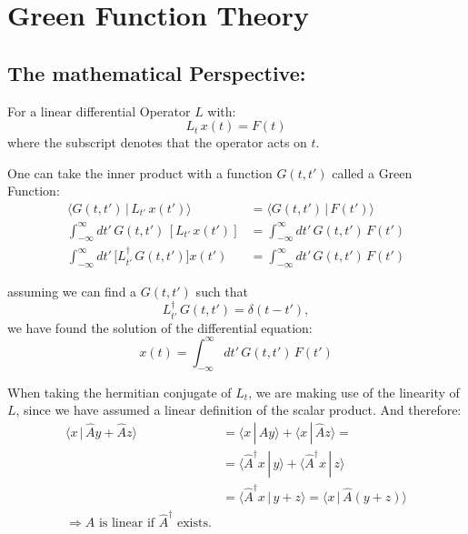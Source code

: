 \chapter{Green Function Theory}\label{chapter:theory}

\section{The mathematical Perspective:}

For a linear differential Operator $L$ with:
\begin{equation*}
    L_t\, x(t) = F(t)
\end{equation*}
where the subscript denotes that the operator acts on $t$.

\bigskip

One can take the inner product with a function $G(t,t')$ called a Green Function:
\begin{align*}
    \langle G(t,t') \,|\, L_{t'}\, x(t') \rangle &= \langle G(t,t') \,|\, F(t') \rangle \\
    \int_{-\infty}^{\infty} dt'\, G(t,t')\, [L_{t'}\, x(t')] &= \int_{-\infty}^{\infty} dt'\, G(t,t')\, F(t') \\
    \int_{-\infty}^{\infty} dt'\, \big[ L_{t'}^{\dagger}\, G(t,t') \big] x(t') &= \int_{-\infty}^{\infty} dt'\, G(t,t')\, F(t')
\end{align*}

assuming we can find a $G(t,t')$ such that
\begin{equation*}
    L_{t'}^{\dagger}\, G(t,t') = \delta(t-t'),
\end{equation*}
we have found the solution of the differential equation:
\begin{equation*}
    x(t) = \int_{-\infty}^{\infty} dt'\, G(t,t')\, F(t')
\end{equation*}

\bigskip

When taking the hermitian conjugate of $L_t$, we are making use of the linearity of $L$, since we have assumed a linear definition of the scalar product. And therefore:
\begin{align*}
    \langle x \,|\, \hat{A}y + \hat{A}z \rangle &= \langle x \,|\, \hat{A}y \rangle + \langle x \,|\, \hat{A}z \rangle = \\
    &= \langle \hat{A}^{\dagger} x \,|\, y \rangle + \langle \hat{A}^{\dagger} x \,|\, z \rangle \\
    &= \langle \hat{A}^{\dagger} x \,|\, y + z \rangle = \langle x \,|\, \hat{A}(y+z) \rangle \\
    \Rightarrow \hat{A} \text{ is linear if } \hat{A}^{\dagger} \text{ exists.}
\end{align*}

